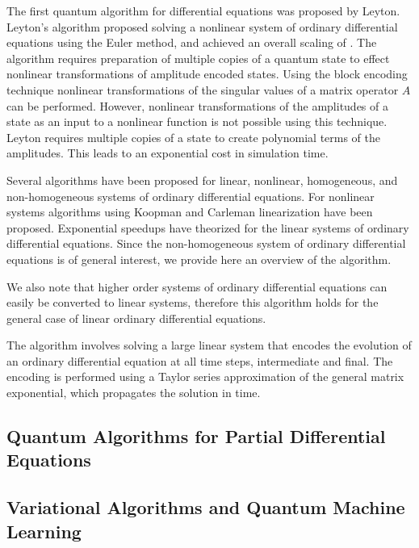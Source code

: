 \documentclass{article}
\begin{document}
The first quantum algorithm for differential equations was proposed by {Leyton}. {Leyton}'s algorithm proposed solving a nonlinear system of ordinary differential equations using the Euler method, and achieved an overall scaling of {}. The algorithm requires preparation of multiple copies of a quantum state to effect nonlinear transformations of amplitude encoded states. Using the block encoding technique nonlinear transformations of the singular values of a matrix operator $A$ can be performed. However, nonlinear transformations of the amplitudes of a state as an input to a nonlinear function is not possible using this technique. {Leyton} requires multiple copies of a state to create polynomial terms of the amplitudes. This leads to an exponential cost in simulation time.






Several algorithms have been proposed for linear, nonlinear, homogeneous, and non-homogeneous systems of ordinary differential equations. For nonlinear systems algorithms using Koopman and Carleman linearization have been proposed. Exponential speedups have theorized for the linear systems of ordinary differential equations. Since the non-homogeneous system of ordinary differential equations is of general interest, we provide here an overview of the algorithm.

We also note that higher order systems of ordinary differential equations can easily be converted to linear systems, therefore this algorithm holds for the general case of linear ordinary differential equations.

The algorithm involves solving a large linear system that encodes the evolution of an ordinary differential equation at all time steps, intermediate and final. The encoding is performed using a Taylor series approximation of the general matrix exponential, which propagates the solution in time.




\subsection{Quantum Algorithms for Partial Differential Equations}


\subsection{Variational Algorithms and Quantum Machine Learning}
\end{document}
